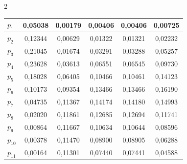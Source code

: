 \begin{multicols}{2}
\begin{table}
\begin{center}
\begin{tabular}{|l|c|c|c|c|c|}
\hline


\hspace*{10mm}$p_1$         & 0,05038 & 0,00179 & 0,00406 & 0,00406 & 0,00725\\


\hline


\hspace*{10mm}$p_2$         & 0,12344 & 0,00629 & 0,01322 & 0,01321 & 0,02232\\


\hline


\hspace*{10mm}$p_3$         & 0,21045 & 0,01674 & 0,03291 & 0,03288 & 0,05257\\


\hline


\hspace*{10mm}$p_4$         & 0,23628 & 0,03613 & 0,06551 & 0,06545 & 0,09730\\


\hline


\hspace*{10mm}$p_5$         & 0,18028 & 0,06405 & 0,10466 & 0,10461 & 0,14123\\


\hline


\hspace*{10mm}$p_6$         & 0,10173 & 0,09354 & 0,13466 & 0,13466 & 0,16190\\


\hline


\hspace*{10mm}$p_7$         & 0,04735 & 0,11367 & 0,14174 & 0,14180 & 0,14993\\


\hline


\hspace*{10mm}$p_8$         & 0,02020 & 0,11861 & 0,12685 & 0,12694 & 0,11741\\


\hline


\hspace*{10mm}$p_9$         & 0,00864 & 0,11667 & 0,10634 & 0,10644 & 0,08596\\


\hline


\hspace*{10mm}$p_{10}$      & 0,00378 & 0,11470 & 0,08900 & 0,08905 & 0,06288\\


\hline


\hspace*{10mm}$p_{11}$      & 0,00164 & 0,11301 & 0,07440 & 0,07441 & 0,04588\\



\end{tabular}
\end{center}
\end{table}
\end{multicols}
